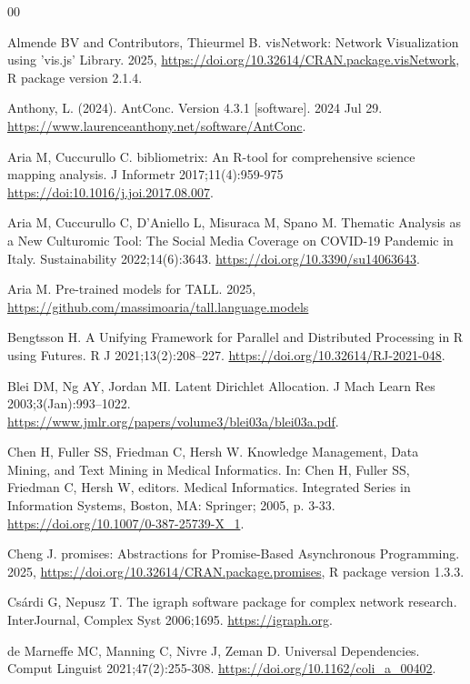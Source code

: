 \documentclass[preprint,12pt,a4paper]{elsarticle}
\begin{document}
\begin{thebibliography}{00}

Almende BV and Contributors, Thieurmel B. visNetwork: Network Visualization using 'vis.js' Library. 2025, \url{https://doi.org/10.32614/CRAN.package.visNetwork}, R package version 2.1.4.

Anthony, L. (2024). AntConc. Version 4.3.1 [software]. 2024 Jul 29. \url{https://www.laurenceanthony.net/software/AntConc}.

 Aria M, Cuccurullo C. bibliometrix: An R-tool for comprehensive science mapping analysis. J Informetr 2017;11(4):959-975 \url{https://doi:10.1016/j.joi.2017.08.007}.

 Aria M, Cuccurullo C, D'Aniello L, Misuraca M, Spano M. Thematic Analysis as a New Culturomic Tool: The Social Media Coverage on COVID-19 Pandemic in Italy. Sustainability 2022;14(6):3643. \url{https://doi.org/10.3390/su14063643}.

 Aria M. Pre-trained models for TALL. 2025, \url{https://github.com/massimoaria/tall.language.models} 

 Bengtsson H. A Unifying Framework for Parallel and Distributed Processing in R using Futures. R J 2021;13(2):208–227. \url{https://doi.org/10.32614/RJ-2021-048}.

 Blei DM, Ng AY, Jordan MI. Latent Dirichlet Allocation. J Mach Learn Res 2003;3(Jan):993–1022. \url{https://www.jmlr.org/papers/volume3/blei03a/blei03a.pdf}.

 Chen H, Fuller SS, Friedman C, Hersh W. Knowledge Management, Data Mining, and Text Mining in Medical Informatics. In: Chen H, Fuller SS, Friedman C, Hersh W, editors. Medical Informatics. Integrated Series in Information Systems, Boston, MA: Springer; 2005, p. 3-33. \url{https://doi.org/10.1007/0-387-25739-X_1}.

 Cheng J. promises: Abstractions for Promise-Based Asynchronous Programming. 2025, \url{https://doi.org/10.32614/CRAN.package.promises}, R package version 1.3.3.

 Cs{\'a}rdi G, Nepusz T. The igraph software package for complex network research. InterJournal, Complex Syst 2006;1695. \url{https://igraph.org}.

 de Marneffe MC, Manning C, Nivre J, Zeman D. Universal Dependencies. Comput Linguist 2021;47(2):255-308. \url{https://doi.org/10.1162/coli_a_00402}.


\end{thebibliography}
\end{document}
